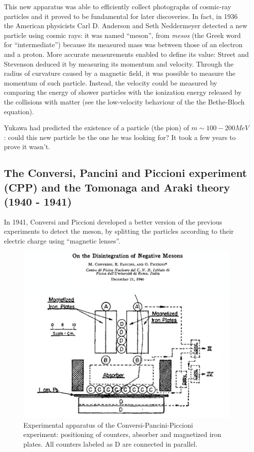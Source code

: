 This new apparatus was able to efficiently collect photographs of cosmic-ray particles and it proved to be fundamental for later discoveries.
In fact, in 1936 the American physicists Carl D. Anderson and Seth Neddermeyer detected a new particle using cosmic rays: it was named ``meson'', from \textit{mesos} (the Greek word for ``intermediate'') because its measured mass was between those of an electron and a proton. 
More accurate measurements enabled to define its value: Street and Stevenson deduced it by measuring its momentum and velocity.
Through the radius of curvature caused by a magnetic field, it was possible to measure the momentum of such particle. Instead, the velocity could be measured by comparing the energy of shower particles with the ionization energy released by the collisions with matter (see the low-velocity behaviour of the the Bethe-Bloch equation).

Yukawa had predicted the existence of a particle (the pion) of $m \sim 100-200 \si{MeV}$: could this new particle be the one he was looking for? It took a few years to prove it wasn't.

\subsection{The Conversi, Pancini and Piccioni experiment (CPP) and the Tomonaga and Araki theory (1940 - 1941) }

In 1941, Conversi and Piccioni developed a better version of the previous experiments to detect the meson, by splitting the particles according to their electric charge using ``magnetic lenses''.

\begin{figure}[!h]
    \centering
    \includegraphics[width=\textwidth]{Figures/FNSN18_5.JPG}
    \caption{Experimental apparatus of the Conversi-Pancini-Piccioni experiment: positioning of counters, absorber and magnetized iron plates. All counters labeled as D are connected in parallel.}
    \label{fig:CPC}
\end{figure} 

